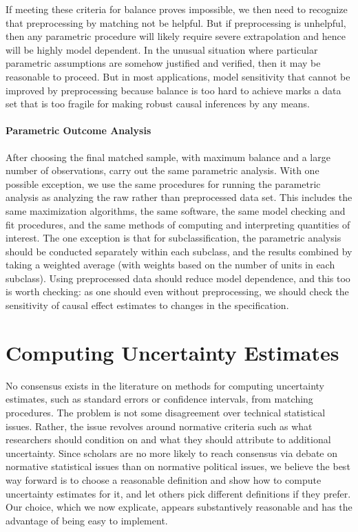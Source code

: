 \documentclass[11pt,titlepage]{article}
\begin{document}
If meeting these criteria for balance proves impossible, we then need
to recognize that preprocessing by matching not be helpful.  But if
preprocessing is unhelpful, then any parametric procedure will likely
require severe extrapolation and hence will be highly model dependent.
In the unusual situation where particular parametric assumptions are
somehow justified and verified, then it may be reasonable to proceed.
But in most applications, model sensitivity that cannot be improved by
preprocessing because balance is too hard to achieve marks a data set
that is too fragile for making robust causal inferences by any means.

\paragraph{Parametric Outcome Analysis}  
After choosing the final matched sample, with maximum balance and a
large number of observations, carry out the same parametric analysis.
With one possible exception, we use the same procedures for running
the parametric analysis as analyzing the raw rather than preprocessed
data set.  This includes the same maximization algorithms, the same
software, the same model checking and fit procedures, and the same
methods of computing and interpreting quantities of interest.  The one
exception is that for subclassification, the parametric analysis
should be conducted separately within each subclass, and the results
combined by taking a weighted average (with weights based on the
number of units in each subclass).  Using preprocessed data should
reduce model dependence, and this too is worth checking: as one should
even without preprocessing, we should check the sensitivity of causal
effect estimates to changes in the specification.

\section{Computing Uncertainty Estimates}

No consensus exists in the literature on methods for computing
uncertainty estimates, such as standard errors or confidence
intervals, from matching procedures.  The problem is not some
disagreement over technical statistical issues.  Rather, the issue
revolves around normative criteria such as what researchers should
condition on and what they should attribute to additional uncertainty.
Since scholars are no more likely to reach consensus via debate on
normative statistical issues than on normative political issues, we
believe the best way forward is to choose a reasonable definition and
show how to compute uncertainty estimates for it, and let others pick
different definitions if they prefer.  Our choice, which we now
explicate, appears substantively reasonable and has the advantage of
being easy to implement.
\end{document}
